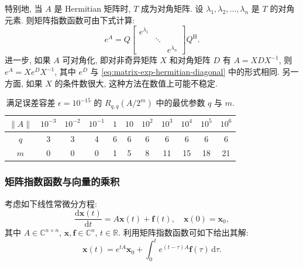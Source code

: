 {特别地, 当 $A$ 是 Hermitian 矩阵时, $T$ 成为对角矩阵. 设 $\lambda_1,\lambda_2,\ldots,\lambda_n$ 是 $T$ 的对角元素. 则矩阵指数函数可由下式计算:}
\begin{equation}\label{eq:matrix-exp-hermitian-diagonal}e^A=Q\begin{bmatrix}e^{\lambda_1}&&\\&\ddots&\\&&e^{\lambda_n}\end{bmatrix}Q^{\mathrm H}.\end{equation}
{进一步, 如果 $A$ 可对角化, 即对非奇异矩阵 $X$ 和对角矩阵 $D$ 有 $A=XDX^{-1}$, 则 $e^A=Xe^DX^{-1}$, 其中 $e^D$ 与 \eqref{eq:matrix-exp-hermitian-diagonal} 中的形式相同. 另一方面, 如果 $X$ 的条件数很大, 这种方法在数值上可能不稳定.}

\begin{table}[H]\centering
\caption{{满足误差容差 $\epsilon=10^{-15}$ 的 $R_{q,q}(A/2^m)$ 中的最优参数 $q$ 与 $m$.}}\label{tab:matrix-exp-pade-parameters}
\begin{tabular}{c|cccccccccc}\hline
$\|A\|$&$10^{-3}$&$10^{-2}$&$10^{-1}$&$1$&$10$&$10^2$&$10^3$&$10^4$&$10^5$&$10^6$\\\hline
$q$&3&3&4&6&6&6&6&6&6&6\\
$m$&0&0&0&1&5&8&11&15&18&21\\\hline
\end{tabular}\end{table}

\subsubsection{{矩阵指数函数与向量的乘积}}\label{subsec:matrix-exponential-vector}

{考虑如下线性常微分方程:}
\begin{equation}\label{eq:matrix-exp-linear-ode}\frac{\mathrm{d}\boldsymbol{x}(t)}{\mathrm{d}t}=A\boldsymbol{x}(t)+\boldsymbol{f}(t),\quad\boldsymbol{x}(0)=\boldsymbol{x}_0,\end{equation}
{其中 $A\in\mathbb{C}^{n\times n}$, $\boldsymbol{x},\boldsymbol{f}\in\mathbb{C}^n$, $t\in\mathbb{R}$. 利用矩阵指数函数可如下给出其解:}
\begin{equation}\label{eq:matrix-exp-variation-of-constants}\boldsymbol{x}(t)=e^{tA}\boldsymbol{x}_0+\int_0^t e^{(t-\tau)A}\boldsymbol{f}(\tau)\,\mathrm{d}\tau.\end{equation}


